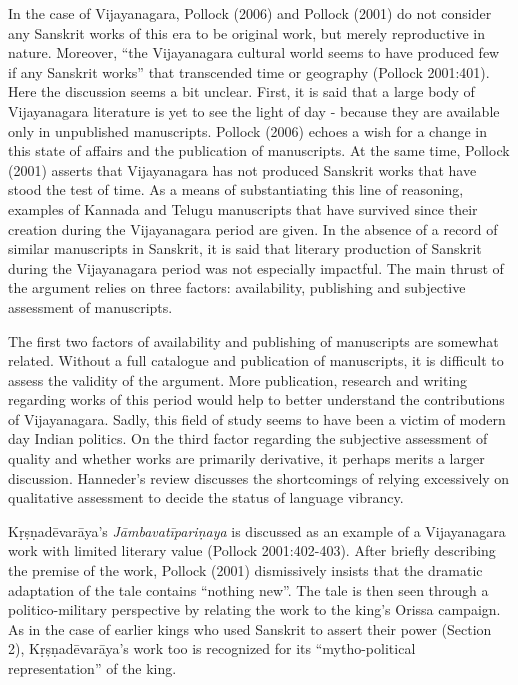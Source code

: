 In the case of Vijayanagara, Pollock (2006) and Pollock (2001) do not consider any Sanskrit works of this era to be original work, but merely reproductive in nature. Moreover, “the Vijayanagara cultural world seems to have produced few if any Sanskrit works” that transcended time or geography (Pollock 2001:401). Here the discussion seems a bit unclear. First, it is said that a large body of Vijayanagara literature is yet to see the light of day - because they are available only in unpublished manuscripts. Pollock (2006) echoes a wish for a change in this state of affairs and the publication of manuscripts. At the same time, Pollock (2001) asserts that Vijayanagara has not produced Sanskrit works that have stood the test of time. As a means of substantiating this line of reasoning, examples of Kannada and Telugu manuscripts that have survived since their creation during the Vijayanagara period are given. In the absence of a record of similar manuscripts in Sanskrit, it is said that literary production of Sanskrit during the Vijayanagara period was not especially impactful. The main thrust of the argument relies on three factors: availability, publishing and subjective assessment of manuscripts.
\vskip 1.5pt

The first two factors of availability and publishing of manuscripts are somewhat related. Without a full catalogue and publication of manuscripts, it is difficult to assess the validity of the argument. More publication, research and writing regarding works of this period would help to better understand the contributions of Vijayanagara. Sadly, this field of study seems to have been a victim of modern day Indian politics. On the third factor regarding the subjective assessment of quality and whether works are primarily derivative, it perhaps merits a larger discussion. Hanneder’s review discusses the shortcomings of relying excessively on qualitative assessment to decide the status of language vibrancy. 
\vskip 1.5pt

Kṛṣṇadēvarāya’s {\sl Jāmbavatīpariṇaya} is discussed as an example of a Vijayanagara work with limited literary value (Pollock 2001:402-403). After briefly describing the premise of the work, Pollock (2001) dismissively insists that the dramatic adaptation of the tale contains “nothing new”. The tale is then seen through a politico-military perspective by relating the work to the king’s Orissa campaign. As in the case of earlier kings who used Sanskrit to assert their power (Section 2), Kṛṣṇadēvarāya’s work too is recognized for its “mytho-political representation” of the king.
\vskip 1.5pt

